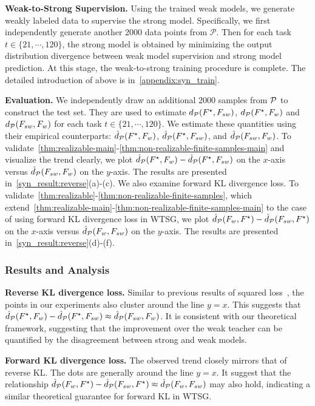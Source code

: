 \noindent \textbf{Weak-to-Strong Supervision.} 
Using the trained weak models, we generate weakly labeled data to supervise the strong model.
Specifically, we first independently generate another 2000 data points from $\mathcal{P}$.
Then for each task $t \in \{ 21, \cdots, 120 \}$, the strong model is obtained by minimizing the output distribution divergence between weak model supervision and strong model prediction.
At this stage, the weak-to-strong training procedure is complete. The detailed introduction of above is in~\cref{appendix:syn_train}.

\noindent \textbf{Evaluation.}
We independently draw an additional 2000 samples from $\mathcal{P}$ to construct the test set.
They are used to estimate $d_\mathcal{P}(F^\star, F_{sw})$, $d_\mathcal{P}(F^\star, F_w)$ and $d_\mathcal{P}(F_{sw}, F_w)$ for each task $t \in \{ 21, \cdots, 120 \}$.
We estimate these quantities using their empirical counterparts: $\hat{d}_\mathcal{P}(F^\star, F_w)$, $\hat{d}_\mathcal{P}(F^\star, F_{sw})$, and $\hat{d}_\mathcal{P}(F_{sw}, F_w)$.
To validate~\cref{thm:realizable-main}-\ref{thm:non-realizable-finite-samples-main} and visualize the trend clearly, we plot $\hat{d}_\mathcal{P}(F^\star, F_w)-\hat{d}_\mathcal{P}(F^\star, F_{sw})$ on the $x$-axis versus $\hat{d}_\mathcal{P}(F_{sw}, F_w)$ on the $y$-axis. The results are presented in~\cref{syn_result:reverse}(a)-(c).
We also examine forward KL divergence loss. 
To validate~\cref{thm:realizable}-\ref{thm:non-realizable-finite-samples}, which extend~\cref{thm:realizable-main}-\ref{thm:non-realizable-finite-samples-main} to the case of using forward KL divergence loss in WTSG,
we plot $\hat{d}_\mathcal{P}(F_w, F^\star)-\hat{d}_\mathcal{P}(F_{sw}, F^\star)$ on the $x$-axis versus $\hat{d}_\mathcal{P}(F_w, F_{sw})$ on the $y$-axis. 
The results are presented in~\cref{syn_result:reverse}(d)-(f).


\subsubsection{Results and Analysis}

\noindent \textbf{Reverse KL divergence loss.}
Similar to previous results of squared loss~\citep{charikar2024quantifying}, the points in our experiments also cluster around the line $y=x$.
This suggests that 
$\hat{d}_\mathcal{P}(F^\star, F_w)-\hat{d}_\mathcal{P}(F^\star, F_{sw}) \approx \hat{d}_\mathcal{P}(F_{sw}, F_w)$.
It is consistent with our theoretical framework, suggesting that the improvement over the weak teacher can be quantified by the disagreement between strong and weak models.

\noindent \textbf{Forward KL divergence loss.}
The observed trend closely mirrors that of reverse KL. 
The dots are generally around the line $y=x$.
It suggest that the relationship 
$\hat{d}_\mathcal{P}(F_w, F^\star)-\hat{d}_\mathcal{P}(F_{sw}, F^\star) \approx \hat{d}_\mathcal{P}(F_w, F_{sw})$
may also hold, indicating a similar theoretical guarantee for forward KL in WTSG.









